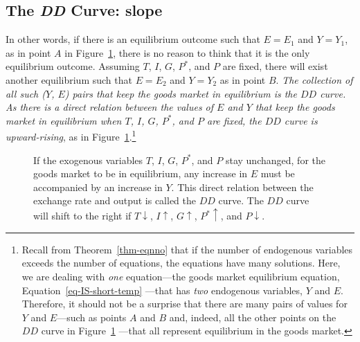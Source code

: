 \documentclass[
  letterpaper,
]{book}
\theoremstyle{plain}
\theoremstyle{remark}
\begin{document}
\subsection{\texorpdfstring{The \emph{DD} Curve:
slope}{The DD Curve: slope}}\label{sec-DD}

In other words, if there is an equilibrium outcome such that \(E=E_1\)
and \(Y=Y_1\), as in point \(A\) in Figure~\ref{fig-DD}, there is no
reason to think that it is the only equilibrium outcome. Assuming \(T\),
\(I\), \(G\), \(P^*\), and \(P\) are fixed, there will exist another
equilibrium such that \(E=E_2\) and \(Y=Y_2\) as in point \(B\).
\emph{The collection of all such (\(Y\), \(E\)) pairs that keep the
goods market in equilibrium is the \(DD\) curve. As there is a direct
relation between the values of \(E\) and \(Y\) that keep the goods
market in equilibrium when \(T\), \(I\), \(G\), \(P^*\), and \(P\) are
fixed, the \(DD\) curve is upward-rising}, as in
Figure~\ref{fig-DD}.\footnote{Recall from Theorem~\ref{thm-eqnno} that
  if the number of endogenous variables exceeds the number of equations,
  the equations have many solutions. Here, we are dealing with
  \emph{one} equation---the goods market equilibrium equation,
  Equation~\ref{eq-IS-short-temp} ---that has \emph{two} endogenous
  variables, \(Y\) and \(E\). Therefore, it should not be a surprise
  that there are many pairs of values for \(Y\) and \(E\)---such as
  points \(A\) and \(B\) and, indeed, all the other points on the \(DD\)
  curve in Figure~\ref{fig-DD} ---that all represent equilibrium in the
  goods market.}

\begin{figure}


\caption{\label{fig-DD}If the exogenous variables \(T\), \(I\), \(G\),
\(P^*\), and \(P\) stay unchanged, for the goods market to be in
equilibrium, any increase in \(E\) must be accompanied by an increase in
\(Y\). This direct relation between the exchange rate and output is
called the \(DD\) curve. The \(DD\) curve will shift to the right if
\(T\downarrow\), \(I\uparrow\), \(G\uparrow\), \(P^*\uparrow\), and
\(P\downarrow\).}

\end{figure}%
\end{document}
